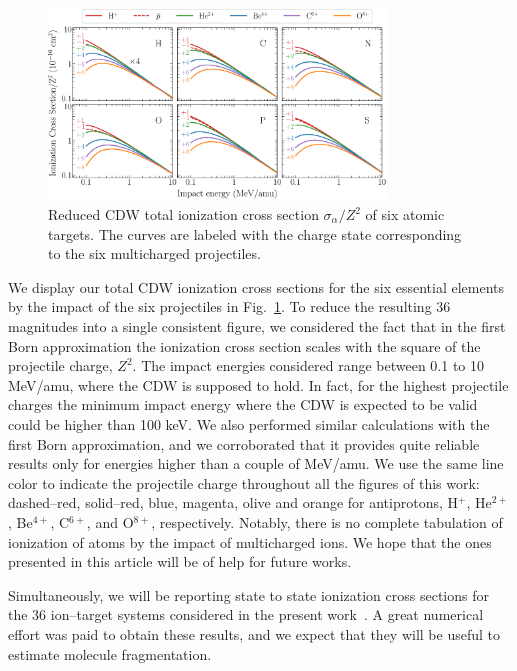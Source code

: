 \documentclass[10pt,showpacs,showkeys,twocolumn]{revtex4}
\begin{document}
\begin{figure}[t!]
\centering
\includegraphics[width=0.8\textwidth]{figuras/atomicscaling.eps}
\caption{Reduced CDW total ionization cross section $\sigma_{\alpha}/Z^2$ 
of six atomic 
targets. The curves are labeled with the charge state corresponding to 
the six multicharged projectiles.}
\label{fig:atomscaling}
\end{figure} 

We display our total CDW ionization cross sections for the six essential 
elements by the impact of the six projectiles in Fig.~\ref{fig:atomscaling}.
To reduce the resulting 36 magnitudes into a single consistent 
figure, we considered the fact that in the first Born approximation
the ionization cross section scales with the square of the projectile 
charge, $Z^{2}$. The impact energies considered 
range between 0.1 to 10 MeV/amu, where the CDW is supposed 
to hold. In fact, for the highest projectile charges the minimum 
impact energy where the CDW is expected to be valid could be 
higher than 100 keV. We also performed similar calculations with the 
first Born approximation, and we corroborated that it provides quite 
reliable results only for energies higher than a couple of MeV/amu. 
We use the same line color to indicate the projectile charge throughout 
all the figures of this work: dashed--red, solid--red, blue, magenta, 
olive and orange for antiprotons, H$^{+}$, He$^{2+}$, Be$^{4+}$, 
C$^{6+}$, and O$^{8+}$, respectively. Notably, there is no complete 
tabulation of ionization of atoms by the impact of multicharged ions. 
We hope that the ones presented in this article will be of help for 
future works.

Simultaneously, we will be reporting state to state ionization cross 
sections for the 36 ion--target systems considered in the present 
work~\cite{miraglia2019}. A great numerical effort was paid to obtain 
these results, and we expect that they will be useful to estimate 
molecule fragmentation.
\end{document}
